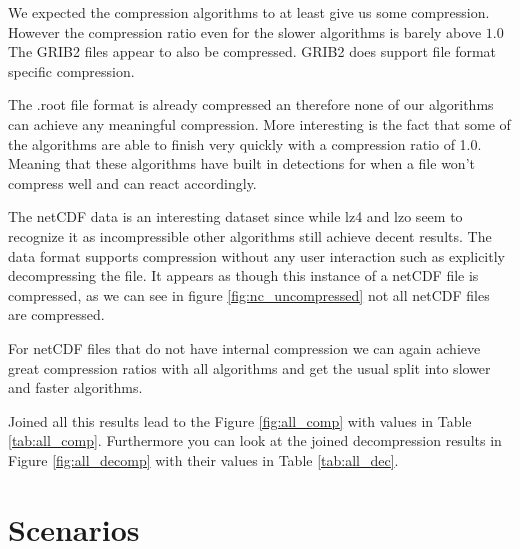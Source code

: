 \documentclass[
	12pt,
	a4paper,
	BCOR10mm,
	DIV14,
	listof=totoc,
	bibliography=totoc,
	headsepline
]{scrreprt}
\begin{document}


\FloatBarrier

We expected the compression algorithms to at least give us some compression.
However the compression ratio even for the slower algorithms is barely above $1.0$
The GRIB2 files appear to also be compressed. GRIB2 does support file format specific compression\textsuperscript{\cite{GRIMP}}.







\FloatBarrier 


The .root file format is already compressed an therefore none of our algorithms can achieve any meaningful compression. More interesting is the fact that some of the algorithms are able to finish very quickly with a compression ratio of 1.0. 
Meaning that these algorithms have built in detections for when a file won't compress well and can react accordingly.
\FloatBarrier






\FloatBarrier

The netCDF data is an interesting dataset since while lz4 and lzo seem to recognize it as incompressible other algorithms still achieve decent results.
The data format supports compression without any user interaction such as explicitly decompressing the file. It appears as though this instance of a netCDF file is compressed, as we can see in figure \ref{fig:nc_uncompressed} not all netCDF files are compressed.







\FloatBarrier

For netCDF files that do not have internal compression we can again achieve great compression ratios with all algorithms and get the usual split into slower and faster algorithms.







\FloatBarrier

Joined all this results lead to the Figure \ref{fig:all_comp} with values in Table \ref{tab:all_comp}.
Furthermore you can look at the joined decompression results in Figure \ref{fig:all_decomp} with their values in Table \ref{tab:all_dec}.
\FloatBarrier

\section{Scenarios}
\label{Scenarios}
\end{document}
